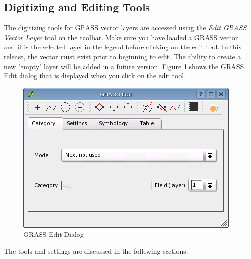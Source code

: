 \documentclass[10pt,english]{article}
\begin{document}
\begin{onehalfspace}
\subsection{Digitizing and Editing Tools}
The digitizing tools for GRASS vector layers are accessed using the \textsl{Edit GRASS Vector Layer} tool on the toolbar. Make sure you have loaded a GRASS vector and it is the selected layer in the legend before clicking on the edit tool. In this release, the vector must exist prior to beginning to edit. The ability to create a new "empty" layer will be added in a future version. Figure \ref{fig:grass_edit} shows the GRASS Edit dialog that is displayed when you click on the edit tool. 
\begin{figure}[h]
   \begin{center}
   \caption{GRASS Edit Dialog}\label{fig:grass_edit}\smallskip
   \includegraphics[scale=.7]{qgis_user_guide_images/grassedit}
\end{center}  
\end{figure}
The tools and settings are discussed in the following sections.\\

\end{onehalfspace}
\end{document}
